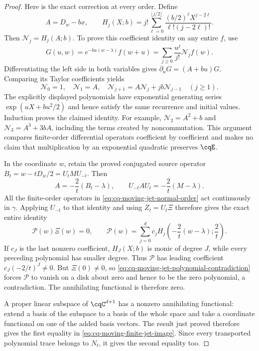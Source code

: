\begin{proof}
Here is the exact correction at every order. Define
\begin{equation}
 A=D_w-bx,\qquad
 H_j(X;b)=j!\sum_{\ell=0}^{\lfloor j/2\rfloor}
        \frac{(b/2)^\ell X^{j-2\ell}}
             {\ell!(j-2\ell)!}.
 \label{eq:cq-moving-jet-Hermite-polynomial}
\end{equation}
Then $\mathcal N_j=H_j(A;b)$. To prove this coefficient
identity on any entire $f$, use
\[
 G(u,w)=e^{-bu(w-\lambda)}f(w+u)
       =\sum_{j\ge0}\frac{u^j}{j!}\mathcal N_jf(w).
\]
Differentiating the left side in both variables gives
$\partial_uG=(A+bu)G$. Comparing its Taylor coefficients yields
\[
 \mathcal N_0=1,\quad \mathcal N_1=A,\quad
 \mathcal N_{j+1}=A\mathcal N_j+jb\mathcal N_{j-1}
 \quad(j\ge1).
\]
The explicitly displayed polynomials have exponential generating
series $\exp(uX+bu^2/2)$ and hence satisfy the same recurrence
and initial values. Induction proves the claimed identity.
For example, $\mathcal N_2=A^2+b$ and
$\mathcal N_3=A^3+3bA$, including the terms created by
noncommutation. This argument compares finite-order differential
operators coefficient by coefficient and makes no claim that
multiplication by an exponential quadratic preserves $\cqE$.

In the coordinate $w$, retain the proved conjugated source
operator $B_t=w-tD_w/2=U_tMU_{-t}$. Then
\[
 A=-\frac2t(B_t-\lambda),\qquad
 U_{-t}AU_t=-\frac2t(M-\lambda).
\]
All the finite-order operators in
\eqref{eq:cq-moving-jet-normal-order} act continuously in
$\gamma$. Applying $U_{-t}$ to that identity and using
$Z_t=U_t\Xi$ therefore gives the exact entire identity
\begin{equation}
 \mathcal P(w)\Xi(w)=0,\qquad
 \mathcal P(w)=\sum_{j=0}^d
   c_jH_j\left(-\frac2t(w-\lambda);\frac2t\right).
 \label{eq:cq-moving-jet-polynomial-contradiction}
\end{equation}
If $c_J$ is the last nonzero coefficient, $H_J(X;b)$ is
monic of degree $J$, while every preceding polynomial has
smaller degree. Thus $\mathcal P$ has leading coefficient
$c_J(-2/t)^J\ne0$. But $\Xi(0)\ne0$, so
\eqref{eq:cq-moving-jet-polynomial-contradiction} forces
$\mathcal P$ to vanish on a disk about zero and hence to
be the zero polynomial, a contradiction. The annihilating
functional is therefore zero.

A proper linear subspace of $\cqC^{d+1}$ has a nonzero
annihilating functional: extend a basis of the subspace to a
basis of the whole space and take a coordinate functional
on one of the added basis vectors. The result just proved
therefore gives the first equality in
\eqref{eq:cq-moving-finite-jet-image}. Since every transported
polynomial trace belongs to $N_t$, it gives the second
equality too.


\end{proof}
